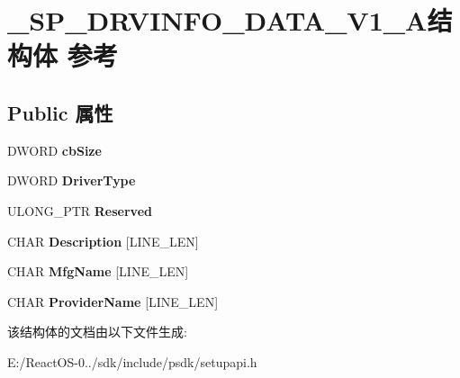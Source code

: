 \hypertarget{struct___s_p___d_r_v_i_n_f_o___d_a_t_a___v1___a}{}\section{\+\_\+\+S\+P\+\_\+\+D\+R\+V\+I\+N\+F\+O\+\_\+\+D\+A\+T\+A\+\_\+\+V1\+\_\+\+A结构体 参考}
\label{struct___s_p___d_r_v_i_n_f_o___d_a_t_a___v1___a}
\subsection*{Public 属性}
\begin{DoxyCompactItemize}
\item 
\mbox{\label{struct___s_p___d_r_v_i_n_f_o___d_a_t_a___v1___a_a5e030d57cb2cc83d197c958b3e1bbd64}} 
D\+W\+O\+RD {\bfseries cb\+Size}
\item 
\mbox{\label{struct___s_p___d_r_v_i_n_f_o___d_a_t_a___v1___a_a5f83530df033b41c78a3cabf3d42e375}} 
D\+W\+O\+RD {\bfseries Driver\+Type}
\item 
\mbox{\label{struct___s_p___d_r_v_i_n_f_o___d_a_t_a___v1___a_a85942344ef0c9cafd43df3d05201da84}} 
U\+L\+O\+N\+G\+\_\+\+P\+TR {\bfseries Reserved}
\item 
\mbox{\label{struct___s_p___d_r_v_i_n_f_o___d_a_t_a___v1___a_aef968c6ab320bbd767689eb90387d322}} 
C\+H\+AR {\bfseries Description} \mbox{[}L\+I\+N\+E\+\_\+\+L\+EN\mbox{]}
\item 
\mbox{\label{struct___s_p___d_r_v_i_n_f_o___d_a_t_a___v1___a_a147aa0fb02495df24b5f9991ab62acc0}} 
C\+H\+AR {\bfseries Mfg\+Name} \mbox{[}L\+I\+N\+E\+\_\+\+L\+EN\mbox{]}
\item 
\mbox{\label{struct___s_p___d_r_v_i_n_f_o___d_a_t_a___v1___a_ad7f2f6c12177519fad7c5dbeea34f3c3}} 
C\+H\+AR {\bfseries Provider\+Name} \mbox{[}L\+I\+N\+E\+\_\+\+L\+EN\mbox{]}
\end{DoxyCompactItemize}


该结构体的文档由以下文件生成\+:\begin{DoxyCompactItemize}
\item 
E\+:/\+React\+O\+S-\/0../sdk/include/psdk/setupapi.\+h\end{DoxyCompactItemize}
